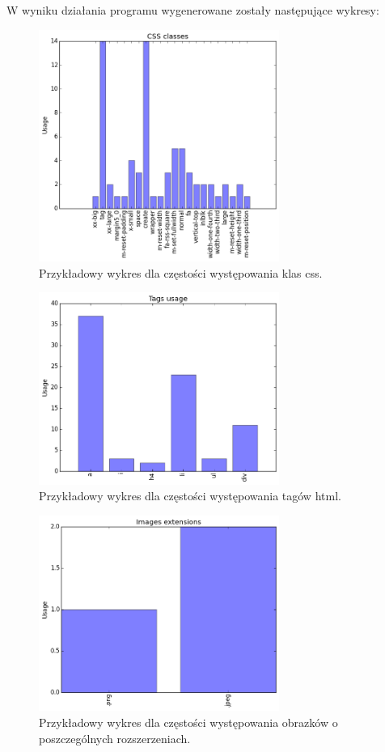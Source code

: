 \documentclass[12pt]{article}
\begin{document}
W wyniku działania programu wygenerowane zostały następujące wykresy:

\begin{figure}[h]
\centering
\caption{Przykładowy wykres dla częstości występowania klas css.}
\label{img:wykresCss}
\includegraphics[width=0.7\textwidth]{WykresCss.png}
\end{figure}

\begin{figure}[h]
\centering
\caption{Przykładowy wykres dla częstości występowania tagów html.}
\label{img:wykresTagi}
\includegraphics[width=0.7\textwidth]{WykresTagi.png}
\end{figure}

\begin{figure}[h]
\centering
\caption{Przykładowy wykres dla częstości występowania obrazków o poszczególnych rozszerzeniach.}
\label{img:wykresObrazki}
\includegraphics[width=0.7\textwidth]{WykresObrazki.png}
\end{figure}
\end{document}
